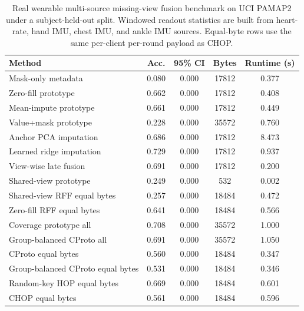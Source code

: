 \begin{table}[t]
\centering
\caption{Real wearable multi-source missing-view fusion benchmark on UCI PAMAP2 under a subject-held-out split. Windowed readout statistics are built from heart-rate, hand IMU, chest IMU, and ankle IMU sources. Equal-byte rows use the same per-client per-round payload as CHOP.}
\label{tab:if-pamap2-fusion}
\scriptsize
\setlength{\tabcolsep}{3pt}
\renewcommand{\arraystretch}{0.94}
\begin{tabular}{lcccc}
\toprule
Method & Acc. & 95\% CI & Bytes & Runtime (s) \\
\midrule
Mask-only metadata & 0.080 & 0.000 & 17812 & 0.377 \\
Zero-fill prototype & 0.662 & 0.000 & 17812 & 0.408 \\
Mean-impute prototype & 0.661 & 0.000 & 17812 & 0.449 \\
Value+mask prototype & 0.228 & 0.000 & 35572 & 0.760 \\
Anchor PCA imputation & 0.686 & 0.000 & 17812 & 8.473 \\
Learned ridge imputation & 0.729 & 0.000 & 17812 & 0.937 \\
View-wise late fusion & 0.691 & 0.000 & 17812 & 0.200 \\
Shared-view prototype & 0.249 & 0.000 & 532 & 0.002 \\
Shared-view RFF equal bytes & 0.257 & 0.000 & 18484 & 0.472 \\
Zero-fill RFF equal bytes & 0.641 & 0.000 & 18484 & 0.566 \\
Coverage prototype all & 0.708 & 0.000 & 35572 & 1.000 \\
Group-balanced CProto all & 0.691 & 0.000 & 35572 & 1.050 \\
CProto equal bytes & 0.560 & 0.000 & 18484 & 0.347 \\
Group-balanced CProto equal bytes & 0.531 & 0.000 & 18484 & 0.346 \\
Random-key HOP equal bytes & 0.669 & 0.000 & 18484 & 0.601 \\
CHOP equal bytes & 0.561 & 0.000 & 18484 & 0.596 \\
\bottomrule
\end{tabular}
\end{table}

